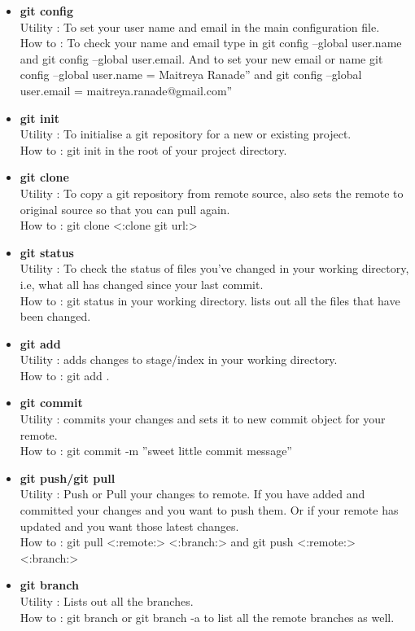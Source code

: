 \begin{itemize}
	\item \textbf{git config} \\ Utility : To set your user name and email in the main configuration file. \\ How to : To check your name and email type in git config --global user.name and git config --global user.email. And to set your new email or name git config --global user.name = Maitreya Ranade” and git config --global user.email = maitreya.ranade@gmail.com”
	\item \textbf{git init} \\ Utility : To initialise a git repository for a new or existing project.\\ How to : git init in the root of your project directory.
	\item \textbf{git clone} \\ Utility : To copy a git repository from remote source, also sets the remote to original source so that you can pull again. \\ How to : git clone <:clone git url:>
	\item \textbf{git status} \\ Utility : To check the status of files you’ve changed in your working directory, i.e, what all has changed since your last commit. \\ How to : git status in your working directory. lists out all the files that have been changed.
	\item \textbf{git add} \\ Utility : adds changes to stage/index in your working directory. \\How to : git add .
	\item \textbf{git commit} \\ Utility : commits your changes and sets it to new commit object for your remote. \\ How to : git commit -m ”sweet little commit message”
	\item \textbf{git push/git pull} \\ Utility : Push or Pull your changes to remote. If you have added and committed your changes and you want to push them. Or if your remote has updated and you want those latest changes.\\ How to : git pull <:remote:> <:branch:> and git push <:remote:> <:branch:>
    \item \textbf{git branch} \\ Utility : Lists out all the branches. \\ How to : git branch or git branch -a to list all the remote branches as well.

\end{itemize}
